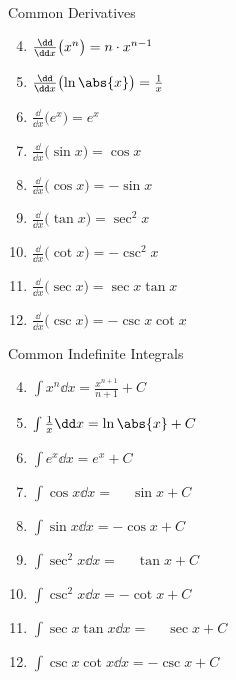 {
\begin{theorem}\label{thm:common_indef_alg}
\mbox{}\\[-2.5\baselineskip]
\parbox[t]{\linewidth}{\begin{multicols}{2}
Common Derivatives
\begin{enumerate}\setcounter{enumi}{3}
\item\label{thm:d_power_rule} $\frac{\dd}{\dd x}\bigl(x^n \bigr) = n\cdot x^{n-1}
\vphantom{\frac{x^n}n}$
\item\label{thm:d_ln_rule} $\frac{\dd}{\dd x}\bigl(\ln\abs{x}\bigr) = \frac1 x$
\item $\frac{\dd}{\dd x}\bigl(e^ x \bigr) = e^x$
\item $\frac{\dd}{\dd x}\bigl(\sin x \bigr) = \cos x$
\item $\frac{\dd}{\dd x}\bigl(\cos x \bigr) = -\sin x$
\item $\frac{\dd}{\dd x}\bigl(\tan x \bigr) = \sec^2 x$
\item $\frac{\dd}{\dd x}\bigl(\cot x \bigr) = -\csc^2 x$
\item $\frac{\dd}{\dd x}\bigl(\sec x \bigr) = \sec x\tan x$
\item $\frac{\dd}{\dd x}\bigl(\csc x \bigr) = -\csc x\cot x$ \quad\null
\end{enumerate}
\columnbreak
Common Indefinite Integrals
\begin{enumerate}\setcounter{enumi}{3}
\item $\int x^n\dd x =\frac{x^{n+1}}{n+1}+ C$
\item $\int \frac{1}x\dd x = \ln\abs{x}+C$
\item $\int e^x\dd x = e^x+C$
\item $\int \cos x\dd x = \phantom{-}\sin x+C$
\item $\int \sin x\dd x = -\cos x+C$
\item $\int \sec^2 x\dd x = \phantom{-}\tan x+C$
\item $\int \csc^2 x\dd x = -\cot x+C$
\item $\int \sec x\tan x\dd x = \phantom{-}\sec x+C$
\item $\int \csc x\cot  x\dd x = -\csc x+C$
\end{enumerate}
\end{multicols}}
\end{theorem}
}

